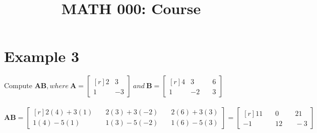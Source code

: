 \documentclass{article}
\title{MATH 000: Course \exerciseset}
\author{\studentname}
\begin{document}
\maketitle

\section*{Example 3}
Compute \(\boldsymbol{AB}, where\ \boldsymbol{A} = \begin{bmatrix*}[r]
2 & 3\\
1 & -3
\end{bmatrix*}\ and\ \boldsymbol{B} = \begin{bmatrix*}[r]
4 & 3 &\quad 6\\
1 & -2 &\quad 3
\end{bmatrix*}\)\\
\\

\(\boldsymbol{AB} = \begin{bmatrix*}[r]

2(4) + 3(1) &\quad 2(3) + 3(-2) &\quad 2(6) + 3(3)\\
1(4) - 5(1) &\quad 1(3) -5(-2) &\quad 1(6) -5(3)

\end{bmatrix*}
= \begin{bmatrix*}[r]

11 &\quad 0 &\quad 21\\
-1 &\quad 12 &\quad -3

\end{bmatrix*}\)
\end{document}
